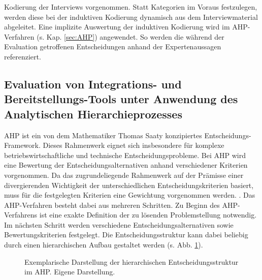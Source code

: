 Kodierung der Interviews vorgenommen. Statt Kategorien im Voraus festzulegen, werden diese bei der induktiven Kodierung dynamisch aus dem Interviewmaterial abgeleitet. Eine implizite Auswertung der induktiven Kodierung wird im AHP-Verfahren (s. Kap. \ref*{sec:AHP}) angewendet. So werden die während der Evaluation getroffenen Entscheidungen anhand der Expertenaussagen referenziert.

\subsection{Evaluation von Integrations- und Bereitstellungs-Tools unter Anwendung des Analytischen Hierarchieprozesses}
\label{sec:meth_ahp}
AHP ist ein von dem Mathematiker Thomas Saaty konzipiertes Entscheidungs-Framework. Dieses Rahmenwerk eignet sich insbesondere für komplexe betriebswirtschaftliche und technische Entscheidungsprobleme. Bei AHP wird eine Bewertung der Entscheidungsalternativen anhand verschiedener Kriterien vorgenommen.  Da das zugrundeliegende Rahmenwerk auf der Prämisse einer divergierenden Wichtigkeit der unterschiedlichen Entscheidungskriterien basiert, muss für die festgelegten Kriterien eine Gewichtung vorgenommen werden. \cite[86]{Saaty.2008}. Das AHP-Verfahren besteht dabei aus mehreren Schritten. Zu Beginn des AHP-Verfahrens ist eine exakte Definition der zu lösenden Problemstellung notwendig. Im nächsten Schritt werden verschiedene Entscheidungsalternativen sowie Bewertungskriterien festgelegt. Die Entscheidungsstruktur kann dabei beliebig durch einen hierarchischen Aufbau gestaltet werden (s. Abb. \ref*{fig:AHP_B}). 
\begin{center}
	\begin{figure}[H]
		\centering
		\caption[Exemplarische Darstellung der hierarchischen Entscheidungsstruktur im AHP]{Exemplarische Darstellung der hierarchischen Entscheidungsstruktur im AHP. Eigene Darstellung.}
		\label{fig:AHP_B}
	\end{figure}
\end{center}
\vspace*{-10mm}
